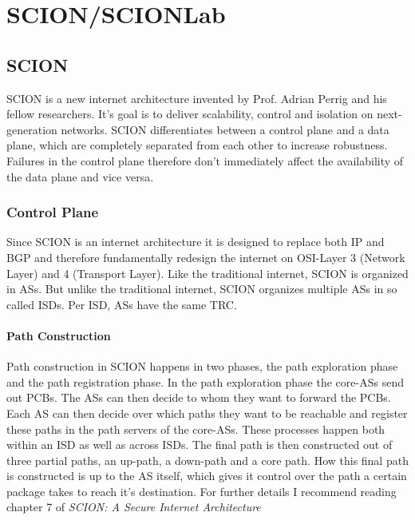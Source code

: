 \chapter{SCION/SCIONLab}

\section{SCION}
\acs{SCION} is a new internet architecture invented by Prof. Adrian Perrig and his fellow researchers. It's goal is to deliver scalability, control and isolation on next-generation networks. \acs{SCION} differentiates between a control plane and a data plane, which are completely separated from each other to increase robustness. Failures in the control plane therefore don't immediately affect the availability of the data plane and vice versa.

\subsection{Control Plane}
Since \acs{SCION} is an internet architecture it is designed to replace both \acs{IP} and \acs{BGP} and therefore fundamentally redesign the internet on \ac{OSI}-Layer 3 (Network Layer) and 4 (Transport Layer). Like the traditional internet, \acs{SCION} is organized in \aclp{AS}. But unlike the traditional internet, \acs{SCION} organizes multiple \acsp{AS} in so called \aclp{ISD}. Per \ac{ISD}, \acsp{AS} have the same \acl{TRC}.

\subsubsection{Path Construction}
Path construction in \acs{SCION} happens in two phases, the path exploration phase and the path registration phase. In the path exploration phase the core-\acsp{AS} send out \acp{PCB}. The \acsp{AS} can then decide to whom they want to forward the \acsp{PCB}. Each \acs{AS} can then decide over which paths they want to be reachable and register these paths in the path servers of the core-\acsp{AS}. These processes happen both within an \acs{ISD} as well as across \acsp{ISD}. The final path is then constructed out of three partial paths, an up-path, a down-path and a core path. How this final path is constructed is up to the \acs{AS} itself, which gives it control over the path a certain package takes to reach it's destination. For further details I recommend reading chapter 7 of \textit{SCION: A Secure Internet Architecture} \cite{perrig2017scion}

